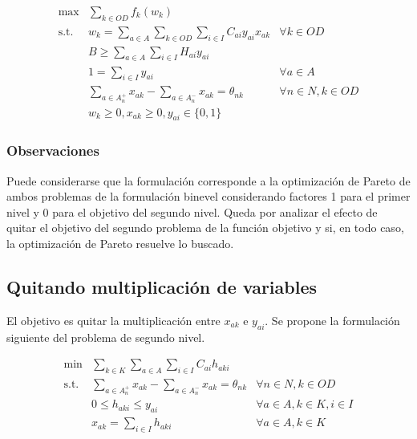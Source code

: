 \documentclass{article}
\begin{document}
  \begin{align}
    \text{max}    & \sum_{k \in OD} f_k(w_k)                                                         & \label{eq:objectivealt} \\
    \text{s.t.}\; & w_k = \sum_{a \in A} \sum_{k \in OD} \sum_{i \in I} C_{ai}y_{ai}x_{ak}           & \forall k \in OD \label{eq:shortestpathalt} \\
                  & B \geq \sum_{a \in A} \sum_{i \in I} H_{ai}y_{ai}                                & \label{eq:respectbudgetalt} \\
                  & 1 = \sum_{i \in I} y_{ai}                                                        & \forall a \in A \label{eq:alwaysoneyalt} \\
                  & \sum_{a \in A_n^+} x_{ak} - \sum_{a \in A_n^-} x_{ak} = \theta_{nk}              & \forall n \in N, k \in OD \label{eq:flowbalancealt} \\
                  & w_k \geq 0, x_{ak} \geq 0, y_{ai} \in \{0,1\}                                    & \nonumber
  \end{align}

  \subsubsection*{Observaciones}

  Puede considerarse que la formulación corresponde a la optimización de Pareto de ambos problemas de la formulación binevel considerando factores 1 para el primer nivel y 0 para el objetivo del segundo nivel. Queda por analizar el efecto de quitar el objetivo del segundo problema de la función objetivo y si, en todo caso, la optimización de Pareto resuelve lo buscado.

  \subsection*{Quitando multiplicación de variables}

  El objetivo es quitar la multiplicación entre $x_{ak}$ e $y_{ai}$. Se propone la formulación siguiente del problema de segundo nivel.

  \begin{align}
    \text{min}  & \sum_{k \in K} \sum_{a \in A} \sum_{i \in I} C_{ai} h_{aki}         & \label{eq:subproblemrefeq1} \\
    \text{s.t.} & \sum_{a \in A_n^+} x_{ak} - \sum_{a \in A_n^-} x_{ak} = \theta_{nk} & \forall n \in N, k \in OD \\
                & 0 \leq h_{aki} \leq y_{ai}                                          & \forall a \in A, k \in K, i \in I \\
                & x_{ak} = \sum_{i \in I} h_{aki}                                     & \forall a \in A, k \in K
  \end{align}
\end{document}
